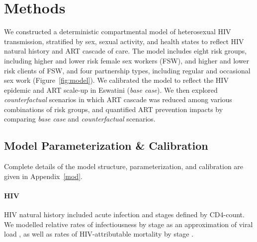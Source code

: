 \section{Methods}\label{art.meth}
We constructed a deterministic compartmental model of heterosexual HIV transmission,
stratified by sex, sexual activity, and health states to reflect HIV natural history and ART cascade of care.
The model includes eight risk groups,
including higher and lower risk female sex workers (FSW), and higher and lower risk clients of FSW,
and four partnership types, including regular and occasional sex work (Figure~\ref{fig:model}).
We calibrated the model to reflect the HIV epidemic and ART scale-up in Eswatini (\emph{base case}).
We then explored \emph{counterfactual} scenarios in which
ART cascade was reduced among various combinations of risk groups,
and quantified ART prevention impacts by comparing \emph{base case} and \emph{counterfactual} scenarios.
\subsection{Model Parameterization \& Calibration}\label{art.meth.par}
Complete details of the model structure, parameterization, and calibration are given in Appendix~\ref{mod}.
\paragraph{HIV}
HIV natural history included acute infection and stages defined by CD4-count.
We modelled relative rates of infectiousness by stage
as an approximation of viral load \cite{Wawer2005,Boily2009,Donnell2010},
as well as rates of HIV-attributable mortality by stage \cite{Badri2006,Anglaret2012,Mangal2017}.
